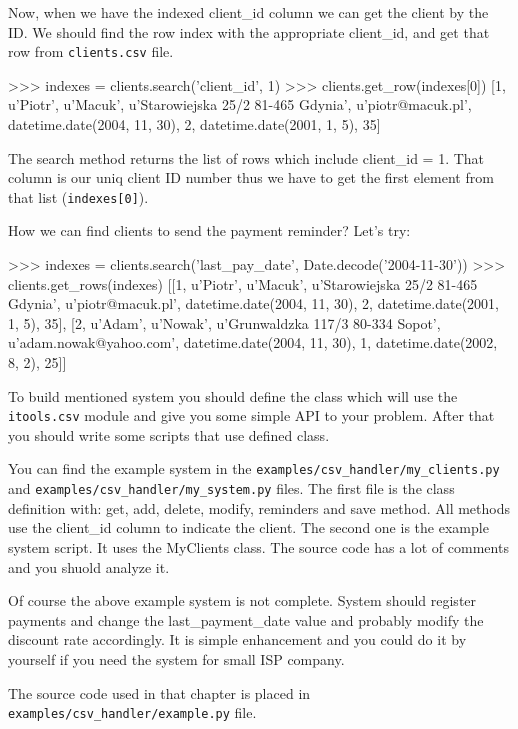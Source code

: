 \documentclass[a4paper]{book}
\begin{document}
Now, when we have the indexed client\_id column we can get the client
by the ID. We should find the row index with the appropriate client\_id,
and get that row from {\tt clients.csv} file.
\begin{code}
    >>> indexes = clients.search('client_id', 1)
    >>> clients.get_row(indexes[0])
    [1, u'Piotr', u'Macuk', u'Starowiejska 25/2 81-465 Gdynia', 
    u'piotr@macuk.pl', datetime.date(2004, 11, 30), 2, 
    datetime.date(2001, 1, 5), 35]
\end{code}
The search method returns the list of rows which include client\_id = 1.
That column is our uniq client ID number thus we have to get the first
element from that list ({\tt indexes[0]}).

How we can find clients to send the payment reminder? Let's try:
\begin{code}
    >>> indexes = clients.search('last_pay_date', Date.decode('2004-11-30'))
    >>> clients.get_rows(indexes)
    [[1, u'Piotr', u'Macuk', u'Starowiejska 25/2 81-465 Gdynia', 
    u'piotr@macuk.pl', datetime.date(2004, 11, 30), 2, 
    datetime.date(2001, 1, 5), 35], [2, u'Adam', u'Nowak', 
    u'Grunwaldzka 117/3 80-334 Sopot', u'adam.nowak@yahoo.com', 
    datetime.date(2004, 11, 30), 1, datetime.date(2002, 8, 2), 25]]
\end{code}

To build mentioned system you should define the class which will use the
{\tt itools.csv} module and give you some simple API to your problem. After
that you should write some scripts that use defined class.

You can find the example system in the 
{\tt examples/csv\_handler/my\_clients.py} and 
{\tt examples/csv\_handler/my\_system.py} files. The first file is the class
definition with: get, add, delete, modify, reminders and save method. 
All methods use the client\_id column to indicate the client. The second one
is the example system script. It uses the MyClients class. 
The source code has a lot of comments and you shuold analyze it.

Of course the above example system is not complete. System should register
payments and change the last\_payment\_date value and probably modify 
the discount rate accordingly. It is simple enhancement and you could do it 
by yourself if you need the system for small ISP company.

The source code used in that chapter is placed in 
{\tt examples/csv\_handler/example.py} file.
\end{document}
